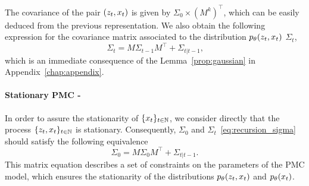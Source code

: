 The covariance of the pair $(z_t,x_t)$
is given by $\Sigma_0 \times  (M^k)^\intercal$, which
can be easily deduced from the previous representation.
We also obtain the following expression for the covariance matrix 
associated to the distribution $p_{\theta}(z_t,x_t)$
 $\Sigma_t$,
\begin{equation}
    \label{eq:recursion_sigma}
    \Sigma_t  = M \Sigma_{t-1} M^\intercal + \Sigma_{t|t-1} \text{,}
\end{equation}
which is an immediate consequence %
of the Lemma~\ref{prop:gaussian} 
in Appendix~\ref{chap:appendix}.

    



\paragraph{Stationary PMC - }
In order to assure the stationarity of $\{x_t\}_{t \in \mathbb{N}}$,
we consider directly that the process $\{z_t,x_t\}_{t\in \mathbb{N}}$
is stationary.
Consequently, $\Sigma_0$  and $\Sigma_t$~\eqref{eq:recursion_sigma}
should satisfy the following equivalence
\begin{equation}
    \label{eq:constraints-pmc}
    \Sigma_0= M \Sigma_0 M^\intercal + \Sigma_{t|t-1} \text{.} 
\end{equation}  
This matrix equation describes 
a set of constraints on the parameters of the PMC model, 
which ensures the stationarity of the distributions
$p_{\theta}(z_t,x_t)$ and $p_{\theta}(x_t)$.


